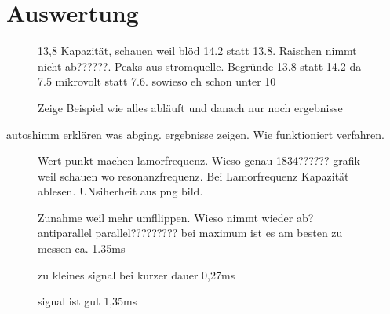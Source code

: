 \section{Auswertung}
\label{sec:Auswertung}

\begin{figure}[ht]
    \centering
    
    \caption[]{13,8 Kapazität, schauen weil blöd 14.2 statt 13.8. Raischen nimmt nicht ab??????. Peaks aus stromquelle. Begründe 13.8 statt 14.2 da 7.5 mikrovolt statt 7.6. sowieso eh schon unter 10}
    \label{fig:MonitorNoise13,8}
\end{figure}

\begin{figure}[ht]
    \centering
    
    \caption[]{Zeige Beispiel wie alles abläuft und danach nur noch ergebnisse}
    \label{fig:PulsandcollectValesignal}
\end{figure}








autoshimm erklären was abging. ergebnisse zeigen. Wie funktioniert verfahren.

\begin{figure}[ht]
    \centering
    
    \caption[]{Wert punkt machen lamorfrequenz. Wieso genau 1834?????? grafik weil schauen wo resonanzfrequenz. Bei Lamorfrequenz Kapazität ablesen. UNsiherheit aus png bild. }
    \label{fig:Coilanalyse}
\end{figure}



\begin{figure}[ht]
    \centering
    
    \caption[]{Zunahme weil mehr umfllippen. Wieso nimmt wieder ab? antiparallel parallel????????? bei maximum ist es am besten zu messen ca. 1.35ms}
    \label{fig:B1dauer}
\end{figure}
\begin{figure}[ht]
    \centering
    
    \caption[]{zu kleines signal bei kurzer dauer 0,27ms}
    \label{fig:B1dauer}
\end{figure}
\begin{figure}[ht]
    \centering
    
    \caption[]{signal ist gut 1,35ms}
    \label{fig:B1dauer}
\end{figure}


